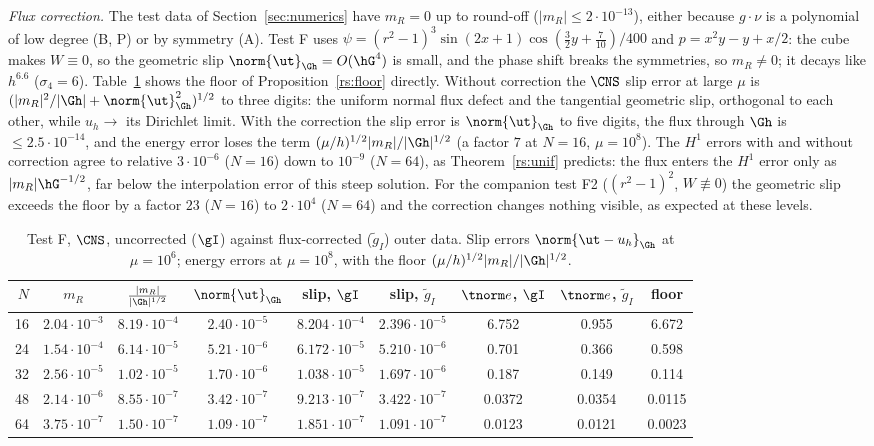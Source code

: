 \emph{Flux correction.} The test data of Section~\ref{sec:numerics} have $m_R=0$ up to round-off ($|m_R|\le2\cdot10^{-13}$), either because $g\cdot\nu$ is a polynomial of low degree (B, P) or by symmetry (A). Test F uses $\psi=(r^2-1)^3\sin(2x+1)\cos(\frac32y+\frac7{10})/400$ and $p=x^2y-y+x/2$: the cube makes $W\equiv0$, so the geometric slip $\norm{\ut}_{\Gh}=O(\hG^4)$ is small, and the phase shift breaks the symmetries, so $m_R\neq0$; it decays like $h^{6.6}$ ($\sigma_4=6$). Table~\ref{rs:tab:flux} shows the floor of Proposition~\ref{rs:floor} directly. Without correction the $\CNS$ slip error at large $\mu$ is $(|m_R|^2/|\Gh|+\norm{\ut}^2_{\Gh})^{1/2}$ to three digits: the uniform normal flux defect and the tangential geometric slip, orthogonal to each other, while $u_h\to$ its Dirichlet limit. With the correction the slip error is $\norm{\ut}_{\Gh}$ to five digits, the flux through $\Gh$ is $\le2.5\cdot10^{-14}$, and the energy error loses the term $(\mu/h)^{1/2}|m_R|/|\Gh|^{1/2}$ (a factor $7$ at $N=16$, $\mu=10^8$). The $H^1$ errors with and without correction agree to relative $3\cdot10^{-6}$ ($N=16$) down to $10^{-9}$ ($N=64$), as Theorem~\ref{rs:unif} predicts: the flux enters the $H^1$ error only as $|m_R|\hG^{-1/2}$, far below the interpolation error of this steep solution. For the companion test F2 ($(r^2-1)^2$, $W\not\equiv0$) the geometric slip exceeds the floor by a factor $23$ ($N=16$) to $2\cdot10^4$ ($N=64$) and the correction changes nothing visible, as expected at these levels.

\begin{table}[h]
\centering\small
\caption{Test F, $\CNS$, uncorrected ($\gI$) against flux-corrected ($\tilde g_I$) outer data. Slip errors $\norm{\ut-u_h}_{\Gh}$ at $\mu=10^6$; energy errors at $\mu=10^8$, with the floor $(\mu/h)^{1/2}|m_R|/|\Gh|^{1/2}$.}\label{rs:tab:flux}
\begin{tabular}{rcccccccc}
\toprule
$N$ & $m_R$ & $\frac{|m_R|}{|\Gh|^{1/2}}$ & $\norm{\ut}_{\Gh}$ & slip, $\gI$ & slip, $\tilde g_I$ & $\tnorm e$, $\gI$ & $\tnorm e$, $\tilde g_I$ & floor\\
\midrule
16 & $2.04\cdot10^{-3}$ & $8.19\cdot10^{-4}$ & $2.40\cdot10^{-5}$ & $8.204\cdot10^{-4}$ & $2.396\cdot10^{-5}$ & 6.752 & 0.955 & 6.672\\
24 & $1.54\cdot10^{-4}$ & $6.14\cdot10^{-5}$ & $5.21\cdot10^{-6}$ & $6.172\cdot10^{-5}$ & $5.210\cdot10^{-6}$ & 0.701 & 0.366 & 0.598\\
32 & $2.56\cdot10^{-5}$ & $1.02\cdot10^{-5}$ & $1.70\cdot10^{-6}$ & $1.038\cdot10^{-5}$ & $1.697\cdot10^{-6}$ & 0.187 & 0.149 & 0.114\\
48 & $2.14\cdot10^{-6}$ & $8.55\cdot10^{-7}$ & $3.42\cdot10^{-7}$ & $9.213\cdot10^{-7}$ & $3.422\cdot10^{-7}$ & 0.0372 & 0.0354 & 0.0115\\
64 & $3.75\cdot10^{-7}$ & $1.50\cdot10^{-7}$ & $1.09\cdot10^{-7}$ & $1.851\cdot10^{-7}$ & $1.091\cdot10^{-7}$ & 0.0123 & 0.0121 & 0.0023\\
\bottomrule
\end{tabular}
\end{table}


